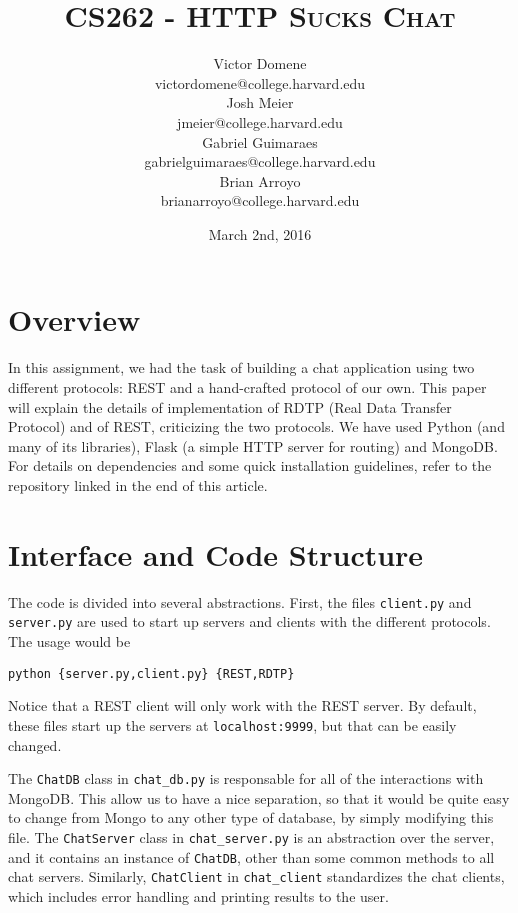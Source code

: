 \documentclass[10pt]{article}
\title{{\textsc{CS262 - HTTP Sucks Chat}}}
\author{Victor Domene \\ \small{victordomene@college.harvard.edu} \\
Josh Meier \\ \small{jmeier@college.harvard.edu} \\
Gabriel Guimaraes \\ \small{gabrielguimaraes@college.harvard.edu} \\ 
Brian Arroyo \\ \small{brianarroyo@college.harvard.edu}}
\date{March 2nd, 2016}
\begin{document}
\hypersetup{linkcolor = black, urlcolor = blue}

\maketitle

\tableofcontents

\newpage

\section{Overview}

In this assignment, we had the task of building a chat application using two
different protocols: REST and a hand-crafted protocol of our own. This paper
will explain the details of implementation of RDTP (Real Data Transfer
Protocol) and of REST, criticizing the two protocols. We have used Python (and many of its libraries), Flask
(a simple HTTP server for routing) and MongoDB. For details on dependencies
and some quick installation guidelines, refer to the repository linked in the
end of this article.

\section{Interface and Code Structure}

The code is divided into several abstractions. First, the files \verb|client.py|
and \verb|server.py| are used to start up servers and clients with the different
protocols. The usage would be

\medskip

\begin{center}
\verb|python {server.py,client.py} {REST,RDTP}|
\end{center}

\medskip

Notice that a REST client will only work with the REST server. By default, these files
start up the servers at \verb|localhost:9999|, but that can be easily changed.

\medskip

The \verb|ChatDB| class in \verb|chat_db.py| is responsable for all of the
interactions with MongoDB. This allow us to have a nice separation, so that it
would be quite easy to change from Mongo to any other type of database, by
simply modifying this file. The \verb|ChatServer| class in \verb|chat_server.py|
is an abstraction over the server, and it contains an instance of \verb|ChatDB|,
other than some common methods to all chat servers. Similarly, \verb|ChatClient|
in \verb|chat_client| standardizes the chat clients, which includes error handling
and printing results to the user.
\end{document}
